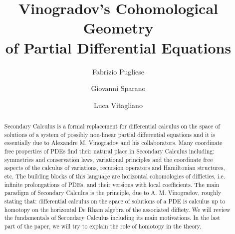 \documentclass{conm-p-l}
\theoremstyle{definition}
\theoremstyle{remark}
\numberwithin{equation}{section}
\begin{document}
\title[Vinogradov's Cohomological Geometry of PDEs]{Vinogradov's Cohomological Geometry\\of Partial Differential Equations}

\author{Fabrizio Pugliese}
\address{DipMat, Universit\`a degli Studi di Salerno, via Giovanni Paolo II n${}^{\circ}$123, 84084 Fisciano (SA), Italy.}

\author{Giovanni Sparano}
\address{DipMat, Universit\`a degli Studi di Salerno, via Giovanni Paolo II n${}^{\circ}$123, 84084 Fisciano (SA), Italy.}

\author{Luca Vitagliano}
\address{DipMat, Universit\`a degli Studi di Salerno, via Giovanni Paolo II n${}^{\circ}$123, 84084 Fisciano (SA), Italy.}

\date{}



\begin{abstract}
Secondary Calculus is a formal replacement for differential calculus on the space of solutions of a system of possibly non-linear partial differential equations and it is essentially due to Alexandre M. Vinogradov and his collaborators. Many coordinate free properties of PDEs find their natural place in Secondary Calculus including: symmetries and conservation laws, variational principles and the coordinate free aspects of the calculus of variations, recursion operators and Hamiltonian structures, etc. The building blocks of this language are horizontal cohomologies of diffieties, i.e. infinite prolongations of PDEs, and their versions with local coefficients. The main paradigm of Secondary Calculus is the principle, due to A. M. Vinogradov, roughly stating that: differential calculus on the space of solutions of a PDE is calculus up to homotopy on the horizontal De Rham algebra of the associated diffiety. We will review the fundamentals of Secondary Calculus including its main motivations. In the last part of the paper, we will try to explain the role of homotopy in the theory.
\end{abstract}
\end{document}
